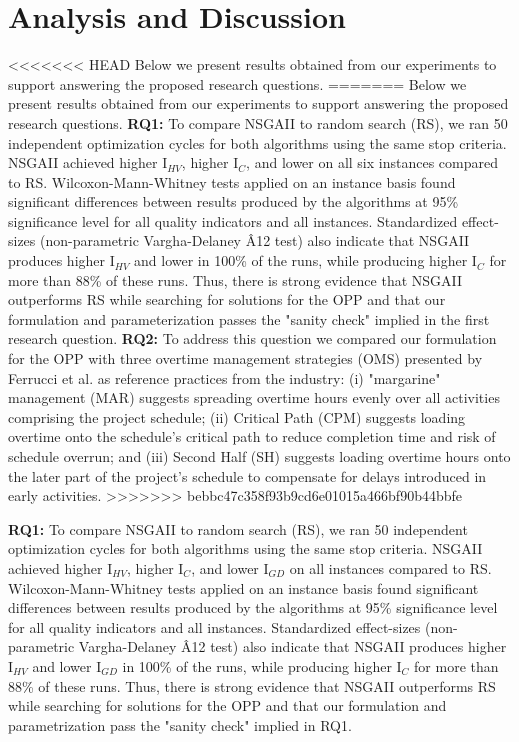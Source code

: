 \documentclass[conference]{IEEEtran}
\begin{document}
\section{Analysis and Discussion}
<<<<<<< HEAD
Below we present results obtained from our experiments to support answering the proposed research questions.
=======
Below we present results obtained from our experiments to support answering the proposed research questions. \linebreak
\textbf{RQ1:} To compare NSGAII to random search (RS), we ran 50 independent optimization cycles for both algorithms using the same stop criteria. NSGAII achieved higher I$_{HV}$, higher I$_{C}$, and lower  on all six instances compared to RS. Wilcoxon-Mann-Whitney tests applied on an instance basis found significant differences between results produced by the algorithms at 95\% significance level for all quality indicators and all instances. Standardized effect-sizes (non-parametric Vargha-Delaney \^A12 test) also indicate that NSGAII produces higher I$_{HV}$ and lower  in 100\% of the runs, while producing higher I$_{C}$ for more than 88\% of these runs. Thus, there is strong evidence that NSGAII outperforms RS while searching for solutions for the OPP and that our formulation and parameterization passes the "sanity check" implied in the first research question.\linebreak
\textbf{RQ2:} To address this question we compared our formulation for the OPP with three overtime management strategies (OMS) presented by Ferrucci et al. \cite{Ferrucci:2013} as reference practices from the industry: (i) "margarine" management (MAR) suggests spreading overtime hours evenly over all activities comprising the project schedule; (ii) Critical Path (CPM) suggests loading overtime onto the schedule's critical path to reduce completion time and risk of schedule overrun; and (iii) Second Half (SH) suggests loading overtime hours onto the later part of the project's schedule to compensate for delays introduced in early activities. 
>>>>>>> bebbc47c358f93b9cd6e01015a466bf90b44bbfe

\noindent
\textbf{RQ1:} To compare NSGAII to random search (RS), we ran 50 independent optimization cycles for both algorithms using the same stop criteria. NSGAII achieved higher I$_{HV}$, higher I$_{C}$, and lower I$_{GD}$ on all instances compared to RS. Wilcoxon-Mann-Whitney tests applied on an instance basis found significant differences between results produced by the algorithms at 95\% significance level for all quality indicators and all instances. Standardized effect-sizes (non-parametric Vargha-Delaney {\^A}12 test) also indicate that NSGAII produces higher I$_{HV}$ and lower I$_{GD}$ in 100\% of the runs, while producing higher I$_{C}$ for more than 88\% of these runs. Thus, there is strong evidence that NSGAII outperforms RS while searching for solutions for the OPP and that our formulation and parametrization pass the "sanity check" implied in RQ1.
\end{document}
